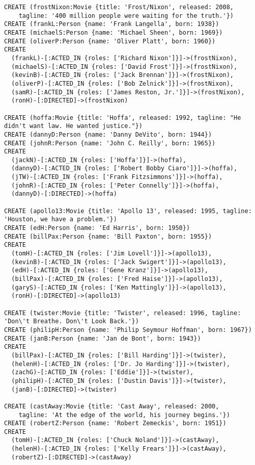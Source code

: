 \begin{lstlisting}
CREATE (frostNixon:Movie {title: 'Frost/Nixon', released: 2008,
    tagline: '400 million people were waiting for the truth.'})
CREATE (frankL:Person {name: 'Frank Langella', born: 1938})
CREATE (michaelS:Person {name: 'Michael Sheen', born: 1969})
CREATE (oliverP:Person {name: 'Oliver Platt', born: 1960})
CREATE
  (frankL)-[:ACTED_IN {roles: ['Richard Nixon']}]->(frostNixon),
  (michaelS)-[:ACTED_IN {roles: ['David Frost']}]->(frostNixon),
  (kevinB)-[:ACTED_IN {roles: ['Jack Brennan']}]->(frostNixon),
  (oliverP)-[:ACTED_IN {roles: ['Bob Zelnick']}]->(frostNixon),
  (samR)-[:ACTED_IN {roles: ['James Reston, Jr.']}]->(frostNixon),
  (ronH)-[:DIRECTED]->(frostNixon)

CREATE (hoffa:Movie {title: 'Hoffa', released: 1992, tagline: "He didn't want law. He wanted justice."})
CREATE (dannyD:Person {name: 'Danny DeVito', born: 1944})
CREATE (johnR:Person {name: 'John C. Reilly', born: 1965})
CREATE
  (jackN)-[:ACTED_IN {roles: ['Hoffa']}]->(hoffa),
  (dannyD)-[:ACTED_IN {roles: ['Robert Bobby Ciaro']}]->(hoffa),
  (jTW)-[:ACTED_IN {roles: ['Frank Fitzsimmons']}]->(hoffa),
  (johnR)-[:ACTED_IN {roles: ['Peter Connelly']}]->(hoffa),
  (dannyD)-[:DIRECTED]->(hoffa)

CREATE (apollo13:Movie {title: 'Apollo 13', released: 1995, tagline: 'Houston, we have a problem.'})
CREATE (edH:Person {name: 'Ed Harris', born: 1950})
CREATE (billPax:Person {name: 'Bill Paxton', born: 1955})
CREATE
  (tomH)-[:ACTED_IN {roles: ['Jim Lovell']}]->(apollo13),
  (kevinB)-[:ACTED_IN {roles: ['Jack Swigert']}]->(apollo13),
  (edH)-[:ACTED_IN {roles: ['Gene Kranz']}]->(apollo13),
  (billPax)-[:ACTED_IN {roles: ['Fred Haise']}]->(apollo13),
  (garyS)-[:ACTED_IN {roles: ['Ken Mattingly']}]->(apollo13),
  (ronH)-[:DIRECTED]->(apollo13)

CREATE (twister:Movie {title: 'Twister', released: 1996, tagline: 'Don\'t Breathe. Don\'t Look Back.'})
CREATE (philipH:Person {name: 'Philip Seymour Hoffman', born: 1967})
CREATE (janB:Person {name: 'Jan de Bont', born: 1943})
CREATE
  (billPax)-[:ACTED_IN {roles: ['Bill Harding']}]->(twister),
  (helenH)-[:ACTED_IN {roles: ['Dr. Jo Harding']}]->(twister),
  (zachG)-[:ACTED_IN {roles: ['Eddie']}]->(twister),
  (philipH)-[:ACTED_IN {roles: ['Dustin Davis']}]->(twister),
  (janB)-[:DIRECTED]->(twister)

CREATE (castAway:Movie {title: 'Cast Away', released: 2000,
    tagline: 'At the edge of the world, his journey begins.'})
CREATE (robertZ:Person {name: 'Robert Zemeckis', born: 1951})
CREATE
  (tomH)-[:ACTED_IN {roles: ['Chuck Noland']}]->(castAway),
  (helenH)-[:ACTED_IN {roles: ['Kelly Frears']}]->(castAway),
  (robertZ)-[:DIRECTED]->(castAway)


\end{lstlisting}
